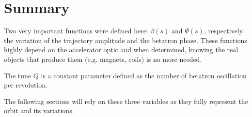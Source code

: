 \section{Summary}
Two very important functions were defined here: $\beta (s)$ and $\Psi (s)$, respectively the variation of the trajectory amplitude and the betatron phase. These functions highly depend on the accelerator optic and when determined, knowing the real objects that produce them (e.g. magnets, coils) is no more needed.

The tune $Q$ is a constant parameter defined as the number of betatron oscillation per revolution.

The following sections will rely on these three variables as they fully represent the orbit and its variations.
